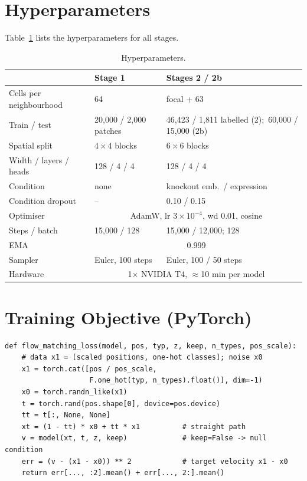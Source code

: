 \documentclass[journal]{IEEEtran}
\begin{document}
\appendices

\section{Hyperparameters}
Table~\ref{tab:hparams} lists the hyperparameters for all stages.
\begin{table}[!h]
\centering
\caption{Hyperparameters.}
\label{tab:hparams}
\small
\begin{tabular}{lll}
\toprule
 & Stage 1 & Stages 2 / 2b \\
\midrule
Cells per neighbourhood & 64 & focal + 63 \\
Train / test & 20{,}000 / 2{,}000 patches & 46{,}423 / 1{,}811 labelled (2);\ 60{,}000 / 15{,}000 (2b) \\
Spatial split & $4\times4$ blocks & $6\times6$ blocks \\
Width / layers / heads & 128 / 4 / 4 & 128 / 4 / 4 \\
Condition & none & knockout emb.\ / expression \\
Condition dropout & -- & 0.10 / 0.15 \\
Optimiser & \multicolumn{2}{c}{AdamW, lr $3\times10^{-4}$, wd 0.01, cosine} \\
Steps / batch & 15{,}000 / 128 & 15{,}000 / 12{,}000; 128 \\
EMA & \multicolumn{2}{c}{0.999} \\
Sampler & Euler, 100 steps & Euler, 100 / 50 steps \\
Hardware & \multicolumn{2}{c}{1$\times$ NVIDIA T4, $\approx$10 min per model} \\
\bottomrule
\end{tabular}
\end{table}

\section{Training Objective (PyTorch)}
\begin{lstlisting}
def flow_matching_loss(model, pos, typ, z, keep, n_types, pos_scale):
    # data x1 = [scaled positions, one-hot classes]; noise x0
    x1 = torch.cat([pos / pos_scale,
                    F.one_hot(typ, n_types).float()], dim=-1)
    x0 = torch.randn_like(x1)
    t = torch.rand(pos.shape[0], device=pos.device)
    tt = t[:, None, None]
    xt = (1 - tt) * x0 + tt * x1          # straight path
    v = model(xt, t, z, keep)             # keep=False -> null condition
    err = (v - (x1 - x0)) ** 2            # target velocity x1 - x0
    return err[..., :2].mean() + err[..., 2:].mean()
\end{lstlisting}
\end{document}
